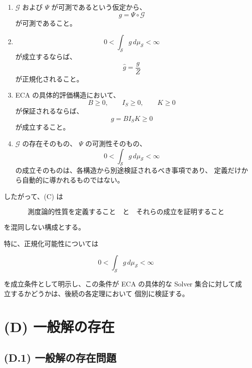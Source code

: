 \documentclass[a4paper,11pt]{article}
\newcommand{\Solver}{\mathcal{S}}
\begin{document}
\begin{enumerate}
    \item
    $\mathcal{G}$ および $\Psi$ が可測であるという仮定から、
    \[
        g=\Psi\circ\mathcal{G}
    \]
    が可測であること。

    \item
    \[
        0<\int_{\Solver}g\,d\mu_{\Solver}<\infty
    \]
    が成立するならば、
    \[
        \widehat g=\frac{g}{Z}
    \]
    が正規化されること。

    \item
    ECA の具体的評価構造において、
    \[
        B\geq0,\qquad I_S\geq0,\qquad K\geq0
    \]
    が保証されるならば、
    \[
        g=BI_SK\geq0
    \]
    が成立すること。

    \item
    $\mathcal{G}$ の存在そのもの、
    $\Psi$ の可測性そのもの、
    \[
        0<
        \int_{\Solver}g\,d\mu_{\Solver}
        <
        \infty
    \]
    の成立そのものは、各構造から別途検証されるべき事項であり、
    定義だけから自動的に導かれるものではない。
\end{enumerate}

したがって、(C) は

\begin{equation}
    \boxed{
    \text{測度論的性質を定義すること}
    \quad\text{と}\quad
    \text{それらの成立を証明すること}
    }
\end{equation}

を混同しない構成とする。

特に、正規化可能性については

\begin{equation}
    0<
    \int_{\Solver}g\,d\mu_{\Solver}
    <
    \infty
\end{equation}

を成立条件として明示し、この条件が ECA の具体的な
Solver 集合に対して成立するかどうかは、後続の各定理において
個別に検証する。


\section{(D) 一般解の存在}
\label{sec:D}

\subsection{(D.1) 一般解の存在問題}
\label{subsec:D1}
\end{document}
